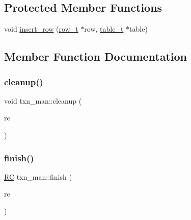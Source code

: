 \subsection*{Protected Member Functions}
\begin{DoxyCompactItemize}
\item 
void \hyperlink{classtxn__man_a4097c7d52e098381113281b88b7c2533}{insert\+\_\+row} (\hyperlink{classrow__t}{row\+\_\+t} $\ast$row, \hyperlink{classtable__t}{table\+\_\+t} $\ast$table)
\end{DoxyCompactItemize}


\subsection{Member Function Documentation}
\mbox{\label{classtxn__man_a8e3cbd946d40e7340f04f9b3760eac62}} 
\subsubsection{\texorpdfstring{cleanup()}{cleanup()}}
{\footnotesize\ttfamily void txn\+\_\+man\+::cleanup (\begin{DoxyParamCaption}\item[{\hyperlink{global_8h_a78c49a674c810fdd03d20432f7be864a}{RC}}]{rc }\end{DoxyParamCaption})}

\mbox{\label{classtxn__man_a05b5aa26d98420d0a913875e5f9c4226}} 
\subsubsection{\texorpdfstring{finish()}{finish()}}
{\footnotesize\ttfamily \hyperlink{global_8h_a78c49a674c810fdd03d20432f7be864a}{RC} txn\+\_\+man\+::finish (\begin{DoxyParamCaption}\item[{\hyperlink{global_8h_a78c49a674c810fdd03d20432f7be864a}{RC}}]{rc }\end{DoxyParamCaption})}

\mbox{\label{classtxn__man_a12f84c603f952cb40c048d799ff43245}} 
